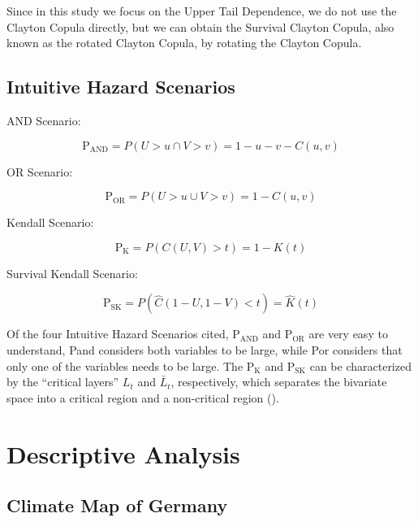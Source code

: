 \documentclass[
]{krantz}
\begin{document}
Since in this study we focus on the Upper Tail Dependence, we do not use the Clayton Copula directly, but we can obtain the Survival Clayton Copula, also known as the rotated Clayton Copula, by rotating the Clayton Copula.

\subsection{Intuitive Hazard Scenarios}\label{intuitive-hazard-scenarios}

AND Scenario:

\[ \text{P}_\text{AND} = P(U > u \cap V > v) = 1 - u - v - C(u, v) \tag{17}\]

OR Scenario:

\[ \text{P}_\text{OR} = P(U > u  \cup V > v) = 1 - C(u, v) \tag{18}\]

Kendall Scenario:

\[ \text{P}_\text{K} = P(C(U, V) > t) = 1 - K(t) \tag{19}\]

Survival Kendall Scenario:

\[ \text{P}_\text{SK} = P( \hat{C}(1 - U, 1 - V) < t) = \hat{K}(t) \tag{20}\]

Of the four Intuitive Hazard Scenarios cited, \(\text{P}_\text{AND}\) and \(\text{P}_\text{OR}\) are very easy to understand, Pand considers both variables to be large, while Por considers that only one of the variables needs to be large. The \(\text{P}_\text{K}\) and \(\text{P}_\text{SK}\) can be characterized by the ``critical layers'' \(L_t\) and \(\bar{L}_t\), respectively, which separates the bivariate space into a critical region and a non-critical region (\citet{zscheischler2020}).

\section{Descriptive Analysis}\label{descriptive-analysis}

\subsection{Climate Map of Germany}\label{climate-map-of-germany}
\end{document}
